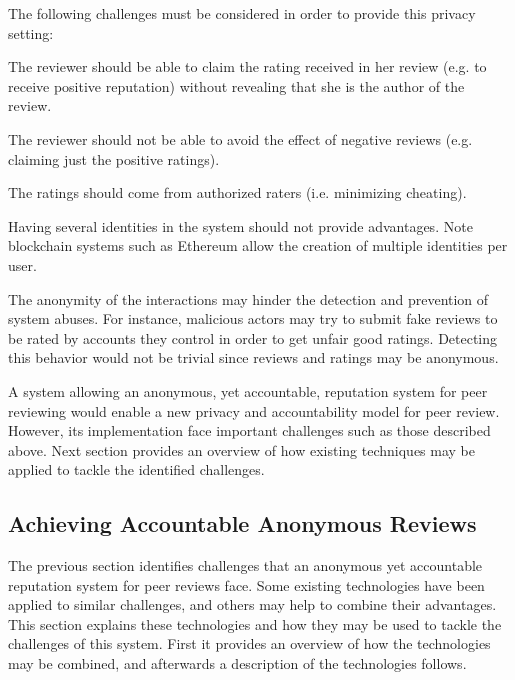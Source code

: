 The following challenges must be considered in order to provide this privacy
setting:
\begin{enumerate}

  \label{ch:anonymity} The reviewer should be able to claim the
  rating received in her review (e.g. to receive positive reputation) without
  revealing that she is the author of the review.

   \label{ch:accountability} The reviewer should not be
  able to avoid the effect of negative reviews (e.g. claiming just the positive
  ratings).
  

   \label{ch:authorization} The ratings should come from
  authorized raters (i.e. minimizing cheating).


   \label{ch:sybil} Having several identities in the
  system should not provide advantages. Note blockchain systems such as Ethereum
  allow the creation of multiple identities per user.


   \label{ch:abuses} The anonymity of the interactions may
  hinder the detection and prevention of system abuses. For instance, malicious
  actors may try to submit fake reviews to be rated by accounts they control in
  order to get unfair good ratings. Detecting this behavior would not be trivial
  since reviews and ratings may be anonymous.

\end{enumerate}

A system allowing an anonymous, yet accountable, reputation system for peer
reviewing would enable a new privacy and accountability model for peer review.
However, its implementation face important challenges such as those described
above. Next section provides an overview of how existing techniques may be
applied to tackle the identified
challenges. %

\subsection{Achieving Accountable Anonymous Reviews}\label{sec:realizing}

The previous section identifies challenges that an anonymous yet accountable
reputation system for peer reviews face. Some existing technologies have been
applied to similar challenges, and others may help to combine their advantages.
This section explains these technologies and how they may be used to tackle the
challenges of this system. First it provides an overview of how the technologies
may be combined, and afterwards a description of the technologies follows.


